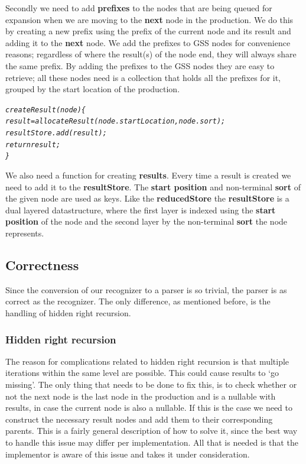 \documentclass[a4paper,10pt]{article}
\begin{document}
Secondly we need to add {\bf prefixes} to the nodes that are being queued for expansion when we are moving to the {\bf next} node in the production. We do this by creating a new prefix using the prefix of the current node and its result and adding it to the {\bf next} node. We add the prefixes to GSS nodes for convenience reasons; regardless of where the result(s) of the node end, they will always share the same prefix. By adding the prefixes to the GSS nodes they are easy to retrieve; all these nodes need is a collection that holds all the prefixes for it, grouped by the start location of the production.

{\small
\begin{alltt}
\textit{createResult(node)\{
  result = allocateResult(node.startLocation, node.sort);
  resultStore.add(result);
  return result;
\}}
\end{alltt}
}

\pagebreak
We also need a function for creating {\bf results}. Every time a result is created we need to add it to the {\bf resultStore}. The {\bf start position} and non-terminal {\bf sort} of the given node are used as keys. Like the {\bf reducedStore} the {\bf resultStore} is a dual layered datastructure, where the first layer is indexed using the {\bf start position} of the node and the second layer by the non-terminal {\bf sort} the node represents.

\subsection{Correctness}
\label{sec:parserCorrectness}

Since the conversion of our recognizer to a parser is so trivial, the parser is as correct as the recognizer. The only difference, as mentioned before, is the handling of hidden right recursion.

\subsubsection{Hidden right recursion}
The reason for complications related to hidden right recursion is that multiple iterations within the same level are possible. This could cause results to `go missing'. The only thing that needs to be done to fix this, is to check whether or not the next node is the last node in the production and is a nullable with results, in case the current node is also a nullable. If this is the case we need to construct the necessary result nodes and add them to their corresponding parents. This is a fairly general description of how to solve it, since the best way to handle this issue may differ per implementation. All that is needed is that the implementor is aware of this issue and takes it under consideration.
\end{document}
